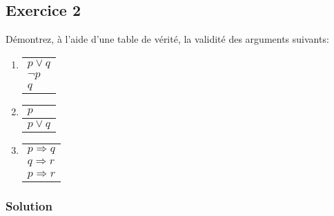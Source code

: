 \subsection*{Exercice 2}
Démontrez, à l'aide d'une table de vérité, la validité des arguments suivants:

\begin{enumerate}
	\item \enter

	\begin{flushleft}
	\begin{tabular}{l}
		$p \vee q$ \\
		$\neg p$ \\
	\hline
	$q$
	\end{tabular}
\end{flushleft}


	\item \enter

	\begin{flushleft}
	\begin{tabular}{l}
		$p$ \\
		\hline
	$p \vee q$
	\end{tabular}

\end{flushleft}

	\item \enter

	\begin{flushleft}
	\begin{tabular}{l}
		$p \Rightarrow q$ \\
		$q \Rightarrow r$ \\
	\hline
	$p \Rightarrow r$
	\end{tabular}

\end{flushleft}

\end{enumerate}

    \subsubsection*{Solution}

